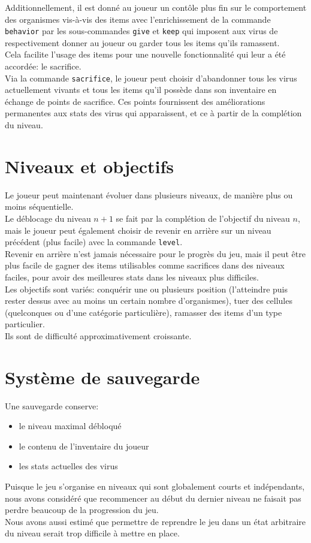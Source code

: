 \documentclass[a4paper,french]{article}
\begin{document}
Additionnellement, il est donn\'e au joueur un cont\^ole plus fin sur le comportement des organismes
vis-\`a-vis des items avec l'enrichissement de la commande \texttt{behavior} par les sous-commandes
\texttt{give} et \texttt{keep} qui imposent aux virus de respectivement donner au joueur ou garder 
tous les items qu'ils ramassent.\\
Cela facilite l'usage des items pour une nouvelle fonctionnalit\'e qui leur a \'et\'e accord\'ee: le sacrifice.\\
Via la commande \texttt{sacrifice}, le joueur peut choisir d'abandonner tous les virus actuellement vivants et tous
les items qu'il poss\`ede dans son inventaire en \'echange de points de sacrifice. Ces points fournissent des am\'eliorations
permanentes aux stats des virus qui apparaissent, et ce \`a partir de la compl\'etion du niveau.

\section{Niveaux et objectifs}
Le joueur peut maintenant \'evoluer dans plusieurs niveaux, de mani\`ere plus ou moins s\'equentielle.\\
Le d\'eblocage du niveau \(n+1\) se fait par la compl\'etion de l'objectif du niveau \(n\), mais le joueur peut \'egalement
choisir de revenir en arri\`ere sur un niveau pr\'ec\'edent (plus facile) avec la commande \texttt{level}.\\
Revenir en arri\`ere n'est jamais n\'ecessaire pour le progr\`es du jeu, mais il peut \^etre plus facile de gagner des items
utilisables comme sacrifices dans des niveaux faciles, pour avoir des meilleures stats dans les niveaux plus difficiles.\\

Les objectifs sont vari\'es: conqu\'erir une ou plusieurs position (l'atteindre puis rester dessus avec au moins un certain nombre d'organismes),
tuer des cellules (quelconques ou d'une cat\'egorie particuli\`ere), ramasser des items d'un type particulier.\\
Ils sont de difficult\'e approximativement croissante.\\

\section{Syst\`eme de sauvegarde}
Une sauvegarde conserve:
\begin{itemize}
    \item le niveau maximal d\'ebloqu\'e
    \item le contenu de l'inventaire du joueur
    \item les stats actuelles des virus
\end{itemize}

Puisque le jeu s'organise en niveaux qui sont globalement courts et ind\'ependants, nous avons consid\'er\'e que recommencer au d\'ebut
du dernier niveau ne faisait pas perdre beaucoup de la progression du jeu.\\
Nous avons aussi estim\'e que permettre de reprendre le jeu dans un \'etat arbitraire du niveau serait trop difficile \`a mettre en place.
\end{document}
